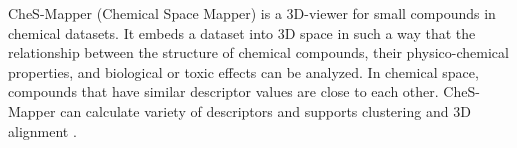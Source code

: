 CheS-Mapper (Chemical Space Mapper) is a 3D-viewer for small compounds in chemical datasets. It embeds a dataset into 3D space in such a way that the relationship between the structure of chemical compounds, their physico-chemical properties, and biological or toxic effects can be analyzed. In chemical space, compounds that have similar descriptor values are close to each other. CheS-Mapper can calculate variety of descriptors and supports clustering and 3D alignment \cite{G_tlein_2012}\cite{G_tlein_2014}. 
